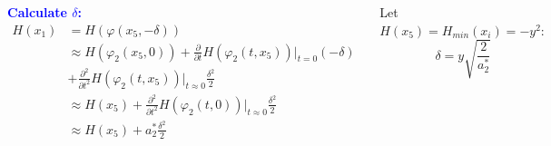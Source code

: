 \documentclass[xcolor=x11names,compress]{beamer}
\renewcommand{\(}{\begin{columns}}
\renewcommand{\)}{\end{columns}}
\newcommand{\<}[1]{\begin{column}{#1}}
\renewcommand{\>}{\end{column}}
\newcommand{\hlb}[1]{\textbf{\textcolor{blue}{#1}}}
\begin{document}
\begin{frame}
\begin{columns}[c]
\hlb{Calculate $\delta$:}
\begin{align*}
H(x_1)&=H(\varphi(x_5,-\delta))\\
&\approx H(\varphi_2(x_5,0))+\frac{\partial}{\partial t}H(\varphi_2(t,x_5))\left.  
\right|_{t=0}(-\delta)\\
&+\frac{\partial^2}{\partial t^2}H(\varphi_2(t,x_5))\left.\right|_{t\approx0}\frac{\delta^2}{2}\\
&\approx H(x_5)+\frac{\partial^2}{\partial t^2}H(\varphi_2(t,0))\left.\right|_{t\approx0}\frac{\delta^2}{2}\\
&\approx H(x_5)+a_2^*\frac{\delta^2}{2}
\end{align*}

Let $H(x_5)=H_{min}(x_i)=-y^2:$ 
\begin{equation}
\label{eq-d}
\delta=y\sqrt{\frac{2}{a_2^*}}
\end{equation}

\begin{center}
\includegraphics[width=\textwidth]{ZDM_eval}
\end{center}

\end{columns}
\end{frame}
\end{document}
